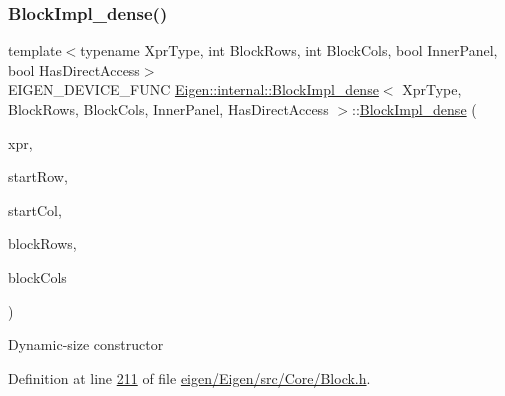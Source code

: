 \subsubsection{\texorpdfstring{Block\+Impl\+\_\+dense()}{BlockImpl\_dense()}\hspace{0.1cm}{\footnotesize\ttfamily [3/6]}}
{\footnotesize\ttfamily template$<$typename Xpr\+Type, int Block\+Rows, int Block\+Cols, bool Inner\+Panel, bool Has\+Direct\+Access$>$ \\
E\+I\+G\+E\+N\+\_\+\+D\+E\+V\+I\+C\+E\+\_\+\+F\+U\+NC \hyperlink{class_eigen_1_1internal_1_1_block_impl__dense}{Eigen\+::internal\+::\+Block\+Impl\+\_\+dense}$<$ Xpr\+Type, Block\+Rows, Block\+Cols, Inner\+Panel, Has\+Direct\+Access $>$\+::\hyperlink{class_eigen_1_1internal_1_1_block_impl__dense}{Block\+Impl\+\_\+dense} (\begin{DoxyParamCaption}\item[{Xpr\+Type \&}]{xpr,  }\item[{\hyperlink{namespace_eigen_a62e77e0933482dafde8fe197d9a2cfde}{Index}}]{start\+Row,  }\item[{\hyperlink{namespace_eigen_a62e77e0933482dafde8fe197d9a2cfde}{Index}}]{start\+Col,  }\item[{\hyperlink{namespace_eigen_a62e77e0933482dafde8fe197d9a2cfde}{Index}}]{block\+Rows,  }\item[{\hyperlink{namespace_eigen_a62e77e0933482dafde8fe197d9a2cfde}{Index}}]{block\+Cols }\end{DoxyParamCaption})\hspace{0.3cm}{\ttfamily [inline]}}

Dynamic-\/size constructor 

Definition at line \hyperlink{eigen_2_eigen_2src_2_core_2_block_8h_source_l00211}{211} of file \hyperlink{eigen_2_eigen_2src_2_core_2_block_8h_source}{eigen/\+Eigen/src/\+Core/\+Block.\+h}.

\mbox{\label{class_eigen_1_1internal_1_1_block_impl__dense_af68c0eafb607bb884cfe507bee39052e}} 
